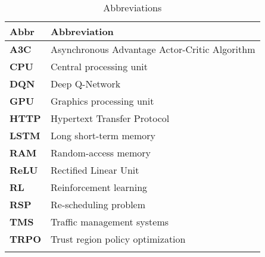 \begin{longtable}{|m{3cm}|m{11cm}|}\hline	
	\rowcolor{gray} \textbf{Abbr}&
	Abbreviation \\ \hline

	\textbf{A3C}&
	Asynchronous Advantage Actor-Critic Algorithm \\ \hline
	
	\textbf{CPU}&
	Central processing unit \\ 
	\hline

	\textbf{DQN}&
	Deep Q-Network \\ 
	\hline
	
	\textbf{GPU}&
	Graphics processing unit \\ 
	\hline

	\textbf{HTTP}&
	Hypertext Transfer Protocol \\ 
	\hline

	\textbf{LSTM}&
	Long short-term memory \\ 
	\hline

	\textbf{RAM}&
	Random-access memory \\
	\hline

	\textbf{ReLU}&
	Rectified Linear Unit \\
	\hline

	\textbf{RL}&
	Reinforcement learning \\ 
	\hline

	\textbf{RSP}&
	Re-scheduling problem \\ 
	\hline

	\textbf{TMS}&
	Traffic management systems \\ 
	\hline

	\textbf{TRPO}&
	Trust region policy optimization \\ 
	\hline

\caption{Abbreviations}
\label{tab:abkuerzungsverzeichnis}
\end{longtable}
